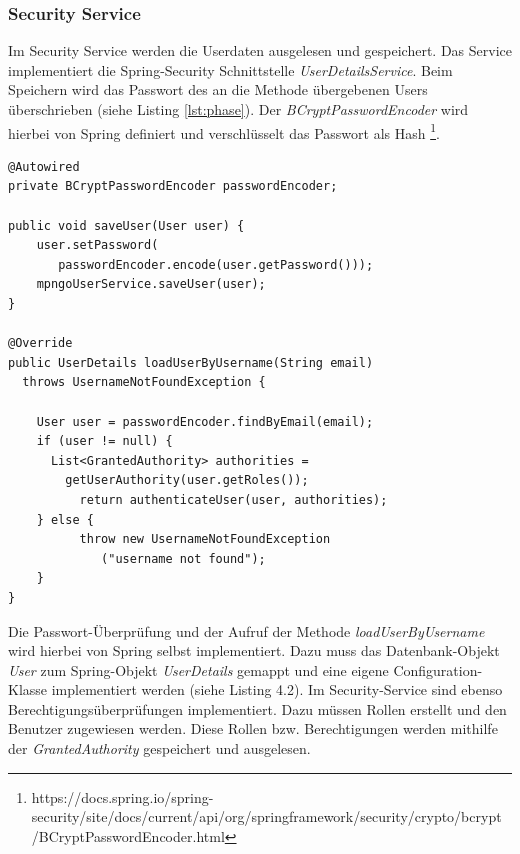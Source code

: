 \subsubsection{Security Service}   
Im Security Service werden die Userdaten ausgelesen und gespeichert. Das Service implementiert die Spring-Security Schnittstelle \textit{UserDetailsService}. Beim Speichern wird das Passwort des an die Methode übergebenen Users überschrieben (siehe Listing \ref{lst:phase}). Der \textit{BCryptPasswordEncoder} wird hierbei von Spring definiert und verschlüsselt das Passwort als Hash \footnote{https://docs.spring.io/spring-security/site/docs/current/api/org/springframework/security/crypto/bcrypt
/BCryptPasswordEncoder.html}. 

\lstset{
  caption={Speichern und Auslesen des Users. Beim Speichern des Benutzers wird das Passwort automatisch verschlüsselt.}, 
  basicstyle=\small\ttfamily, 
  label=lst:phase, 
  language=Java,
  frame=single,
  breaklines=true, %
  postbreak=\mbox{\textcolor{red}{$\hookrightarrow$}\space},
}

\begin{samepage}%
	\begin{lstlisting}[float=tbhp]
@Autowired
private BCryptPasswordEncoder passwordEncoder;

public void saveUser(User user) {
    user.setPassword(
       passwordEncoder.encode(user.getPassword()));
    mpngoUserService.saveUser(user);
}

@Override
public UserDetails loadUserByUsername(String email) 
  throws UsernameNotFoundException {

    User user = passwordEncoder.findByEmail(email);
    if (user != null) {
      List<GrantedAuthority> authorities =     
        getUserAuthority(user.getRoles());
          return authenticateUser(user, authorities);
    } else {
          throw new UsernameNotFoundException
             ("username not found");
    }
}
	\end{lstlisting}
\end{samepage}
Die Passwort-Überprüfung und der Aufruf der Methode \textit{loadUserByUsername} wird hierbei von Spring selbst implementiert.  Dazu muss das Datenbank-Objekt \textit{User} zum Spring-Objekt \textit{UserDetails} gemappt und eine eigene Configuration-Klasse implementiert werden (siehe Listing 4.2). Im Security-Service sind ebenso Berechtigungsüberprüfungen implementiert. Dazu müssen Rollen erstellt und den Benutzer zugewiesen werden. Diese Rollen bzw. Berechtigungen werden mithilfe der \textit{GrantedAuthority} gespeichert und ausgelesen.

